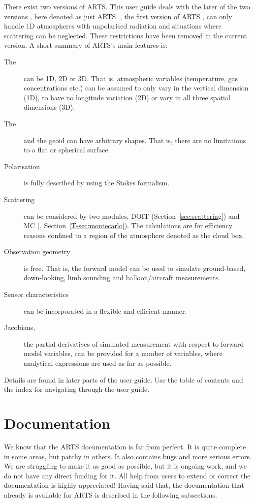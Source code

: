 There exist two versions of ARTS. This user guide deals with the later
of the two versions \citep{eriksson:arts2:11}, here denoted as just
ARTS. , the first version of ARTS
\citep{buehler:artst:05}, can only handle 1D atmospheres with
unpolarised radiation and situations where scattering can be
neglected.  These restrictions have been removed in the current
version. A short summary of ARTS's main features is:
\begin{description}
\item[The ] can be 1D, 2D or 3D. That is, atmospheric
  variables (temperature, gas concentrations etc.) can be assumed to
  only vary in the vertical dimension (1D), to have no longitude
  variation (2D) or vary in all three spatial dimensions (3D).
\item[The ] and the geoid can have arbitrary shapes. That is,
  there are no limitations to a flat or spherical surface.
\item[Polarisation] is fully described by using the Stokes formalism.
\item[Scattering] can be considered by two modules, DOIT
  (Section~\ref{sec:scattering}) and MC
  (\theory, Section~\ref{T-sec:montecarlo}). The  calculations are for
  efficiency reasons confined to a region of the atmosphere denoted as
  the cloud box.
\item[Observation geometry] is free. That is, the forward model can be
  used to simulate ground-based, down-looking, limb sounding and
  balloon/aircraft measurements.
\item[Sensor characteristics] can be incorporated in a flexible and
  efficient manner.
\item[Jacobians,] the partial derivatives of simulated measurement
  with respect to forward model variables, can be provided for a
  number of variables, where analytical expressions are used as far as
  possible.
\end{description}
Details are found in later parts of the user guide. Use the table of
contents and the index for navigating through the user guide.



\section{Documentation}
\label{sec:concept:doc}

We know that the ARTS documentation is far from perfect. It is quite
complete in some areas, but patchy in others. It also contains bugs
and more serious errors. We are struggling to make it as good as
possible, but it is ongoing work, and we do not have any direct
funding for it. All help from users to extend or correct the
documentation is highly appreciated! Having said that, the
documentation that already is available for ARTS is described in the
following subsections.

